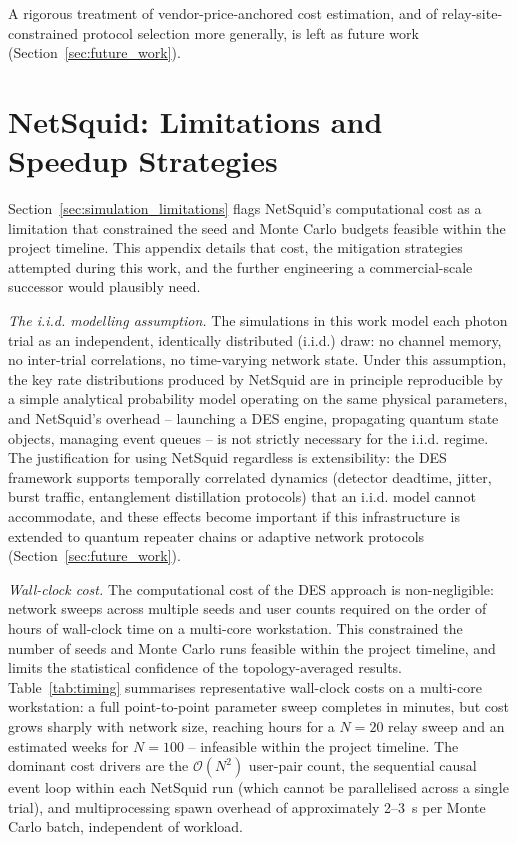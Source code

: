 \documentclass[12pt]{article}
\let\oldsection\section
\renewcommand{\section}{\clearpage\oldsection}
\begin{document}
A rigorous treatment of vendor-price-anchored cost estimation, and of relay-site-constrained protocol selection more generally, is left as future work (Section~\ref{sec:future_work}).

\section{NetSquid: Limitations and Speedup Strategies}
\label{sec:appendix_netsquid}

Section~\ref{sec:simulation_limitations} flags NetSquid's computational cost as a limitation that constrained the seed and Monte Carlo budgets feasible within the project timeline. This appendix details that cost, the mitigation strategies attempted during this work, and the further engineering a commercial-scale successor would plausibly need.

\textit{The i.i.d. modelling assumption.} The simulations in this work model each photon trial as an independent, identically distributed (i.i.d.) draw: no channel memory, no inter-trial correlations, no time-varying network state. Under this assumption, the key rate distributions produced by NetSquid are in principle reproducible by a simple analytical probability model operating on the same physical parameters, and NetSquid's overhead -- launching a DES engine, propagating quantum state objects, managing event queues -- is not strictly necessary for the i.i.d. regime. The justification for using NetSquid regardless is extensibility: the DES framework supports temporally correlated dynamics (detector deadtime, jitter, burst traffic, entanglement distillation protocols) that an i.i.d. model cannot accommodate, and these effects become important if this infrastructure is extended to quantum repeater chains or adaptive network protocols (Section~\ref{sec:future_work}).

\textit{Wall-clock cost.} The computational cost of the DES approach is non-negligible: network sweeps across multiple seeds and user counts required on the order of hours of wall-clock time on a multi-core workstation. This constrained the number of seeds and Monte Carlo runs feasible within the project timeline, and limits the statistical confidence of the topology-averaged results. Table~\ref{tab:timing} summarises representative wall-clock costs on a multi-core workstation: a full point-to-point parameter sweep completes in minutes, but cost grows sharply with network size, reaching hours for a $N{=}20$ relay sweep and an estimated weeks for $N{=}100$ -- infeasible within the project timeline. The dominant cost drivers are the $\mathcal{O}(N^2)$ user-pair count, the sequential causal event loop within each NetSquid run (which cannot be parallelised across a single trial), and multiprocessing spawn overhead of approximately 2--3~s per Monte Carlo batch, independent of workload.
\end{document}
